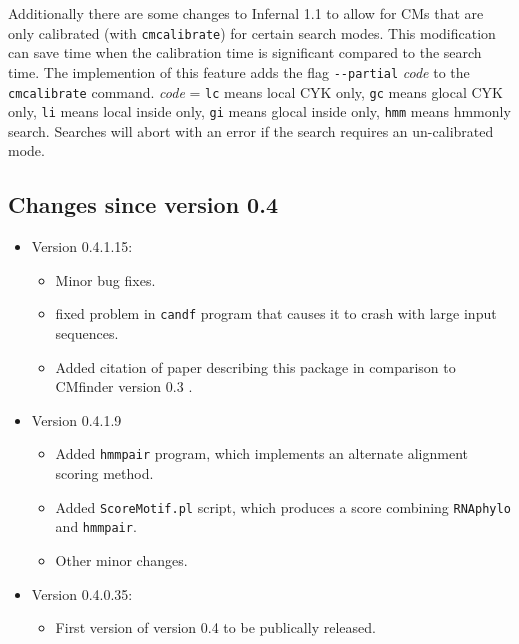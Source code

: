 \documentclass[letterpaper,12pt]{report}
\begin{document}
Additionally there are some changes to Infernal 1.1 to allow for CMs that are only calibrated (with {\tt cmcalibrate}) for certain search modes.  This modification can save time when the calibration time is significant compared to the search time.  The implemention of this feature adds the flag {\tt -{}-partial} {\it code} to the {\tt cmcalibrate} command.  {\it code} = {\tt lc} means local CYK only, {\tt gc} means glocal CYK only, {\tt li} means local inside only, {\tt gi} means glocal inside only, {\tt hmm} means hmmonly search.  Searches will abort with an error if the search requires an un-calibrated mode.

\subsection{Changes since version 0.4}

\begin{itemize}
\item Version 0.4.1.15:
\begin{itemize}
\item Minor bug fixes.
\item fixed problem in {\tt candf} program that causes it to crash with large input sequences.
  \item Added citation of paper describing this package in comparison to CMfinder version 0.3 \cite{MotifsTwoTwoFour}.
\end{itemize}
\item Version 0.4.1.9
\begin{itemize}
\item Added {\tt hmmpair} program, which implements an alternate alignment scoring method.
\item Added {\tt ScoreMotif.pl} script, which produces a score combining {\tt RNAphylo} and {\tt hmmpair}.
\item Other minor changes.
\end{itemize}
\item Version 0.4.0.35:
\begin{itemize}
\item First version of version 0.4 to be publically released.
\end{itemize}
\end{itemize}
\end{document}
